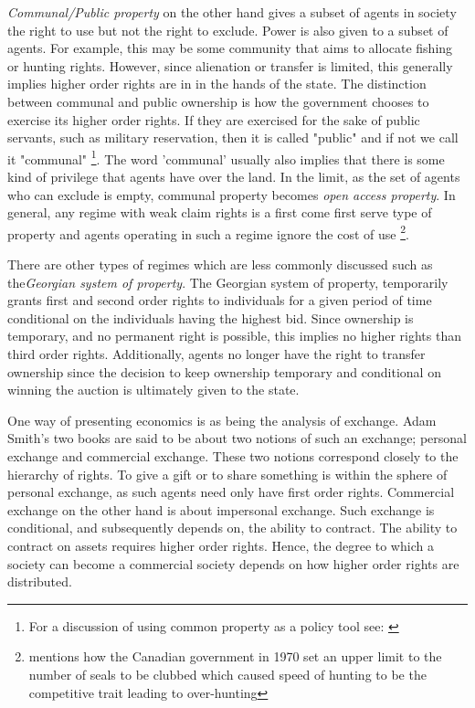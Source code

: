\textit{Communal/Public property} on the other hand gives a subset of agents in society the right to use but not the right to exclude. Power is also given to a subset of agents. For example, this may be some community that aims to allocate fishing or hunting rights.
However, since alienation or transfer is limited, this generally implies higher order rights are in in the hands of the state. The distinction between communal and public ownership is how the government chooses to exercise its higher order rights. If they are exercised for the sake of public servants, such as military reservation, then it is called "public" and if not we call it "communal" \footnote{For a discussion of using common property as a policy tool see: \cite{ciriacy1975common}}. The word 'communal' usually also implies that there is some kind of privilege that agents have over the land. In the limit, as the set of agents who can exclude is empty, communal property becomes \textit{open access property}. In general, any regime with weak claim rights is a first come first serve type of property and agents operating in such a regime ignore the cost of use \footnote{\cite{Alchian1973} mentions how the Canadian government in 1970 set an upper limit to the number of seals to be clubbed which caused speed of hunting to be the competitive trait leading to over-hunting}.

There are other types of regimes which are less commonly discussed such as the\textit{Georgian system of property}. The Georgian system of property, temporarily grants first and second order rights to individuals for a given period of time conditional on the individuals having the highest bid. Since ownership is temporary, and no permanent right is possible, this implies no higher rights than third order rights. Additionally, agents no longer have the right to transfer ownership since the decision to keep ownership temporary and conditional on winning the auction is ultimately given to the state.

One way of presenting economics is as being the analysis of exchange. Adam Smith's two books are said to be about two notions of such an exchange; personal exchange and commercial exchange. These two notions correspond closely to the hierarchy of rights. To give a gift or to share something is within the sphere of personal exchange, as such agents need only have first order rights. Commercial exchange on the other hand is about impersonal exchange. Such exchange is conditional, and subsequently depends on, the ability to contract. The ability to contract on assets requires higher order rights. Hence, the degree to which a society can become a commercial society depends on how higher order rights are distributed. 

